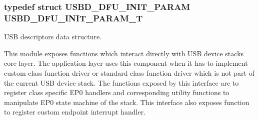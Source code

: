 \subsubsection[{\texorpdfstring{U\+S\+B\+D\+\_\+\+D\+F\+U\+\_\+\+I\+N\+I\+T\+\_\+\+P\+A\+R\+A\+M\+\_\+T}{USBD_DFU_INIT_PARAM_T}}]{\setlength{\rightskip}{0pt plus 5cm}typedef struct {\bf U\+S\+B\+D\+\_\+\+D\+F\+U\+\_\+\+I\+N\+I\+T\+\_\+\+P\+A\+R\+AM}  {\bf U\+S\+B\+D\+\_\+\+D\+F\+U\+\_\+\+I\+N\+I\+T\+\_\+\+P\+A\+R\+A\+M\+\_\+T}}\hypertarget{group__USBD__DFU_ga8506b43ae2bda83cc8c459114fd3fc82}{}\label{group__USBD__DFU_ga8506b43ae2bda83cc8c459114fd3fc82}


U\+SB descriptors data structure. 

This module exposes functions which interact directly with U\+SB device stack\textquotesingle{}s core layer. The application layer uses this component when it has to implement custom class function driver or standard class function driver which is not part of the current U\+SB device stack. The functions exposed by this interface are to register class specific E\+P0 handlers and corresponding utility functions to manipulate E\+P0 state machine of the stack. This interface also exposes function to register custom endpoint interrupt handler. 